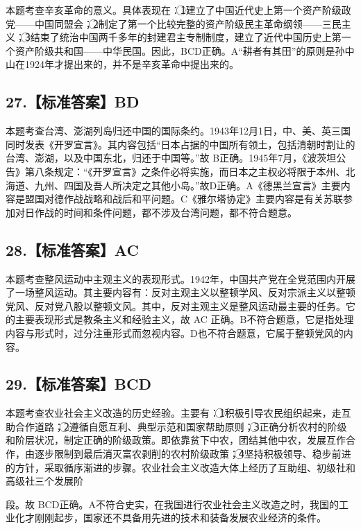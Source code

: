 \documentclass[UTF8,11pt]{ctexart}
\begin{document}
本题考查辛亥革命的意义。具体表现在：\textcircled{1}建立了中国近代史上第一个资产阶级政党——中国同盟会；\textcircled{2}制定了第一个比较完整的资产阶级民主革命纲领——三民主义；\textcircled{3}结束了统治中国两千多年的封建君主专制制度，建立了近代中国历史上第一个资产阶级共和国——中华民国。因此，BCD正确。A“耕者有其田”的原则是孙中山在1924年才提出来的，并不是辛亥革命中提出来的。


\subsection*{27.【标准答案】BD}

本题考查台湾、澎湖列岛归还中国的国际条约。1943年12月1日，中、美、英三国同时发表《开罗宣言》。其内容包括“日本占据的中国所有领土，包括清朝时割让的台湾、澎湖，以及中国东北，归还于中国等。”故 B正确。1945年7月，《波茨坦公告》第八条规定：“《开罗宣言》之条件必将实施，而日本之主权必将限于本州、北海道、九州、四国及吾人所决定之其他小岛。”故D正确。A《德黑兰宣言》主要内容是盟国对德作战战略和战后和平问题。C《雅尔塔协定》主要内容是有关苏联参加对日作战的时间和条件问题，都不涉及台湾问题，都不符合题意。


\subsection*{28.【标准答案】AC}

本题考查整风运动中主观主义的表现形式。1942年，中国共产党在全党范围内开展了一场整风运动。其主要内容有：反对主观主义以整顿学风、反对宗派主义以整顿党风、反对党八股以整顿文风。其中，反对主观主义是整风运动最主要的任务。它的主要表现形式是教条主义和经验主义，故 AC 正确。B不符合题意，它是指处理内容与形式时，过分注重形式而忽视内容。D也不符合题意，它属于整顿党风的内容。


\subsection*{29.【标准答案】BCD}

本题考查农业社会主义改造的历史经验。主要有：\textcircled{1}积极引导农民组织起来，走互助合作道路；\textcircled{2}遵循自愿互利、典型示范和国家帮助原则；\textcircled{3}正确分析农村的阶级和阶层状况，制定正确的阶级政策。即依靠贫下中农，团结其他中农，发展互作合作，由逐步限制到最后消灭富农剥削的农村阶级政策；\textcircled{4}坚持积极领导、稳步前进的方针，采取循序渐进的步骤。农业社会主义改造大体上经历了互助组、初级社和高级社三个发展阶


段。故 BCD正确。A不符合史实，在我国进行农业社会主义改造之时，我国的工业化才刚刚起步，国家还不具备用先进的技术和装备发展农业经济的条件。
\end{document}
